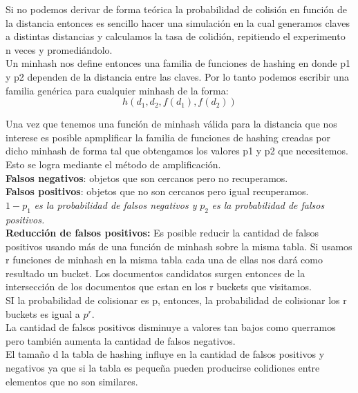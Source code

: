 \documentclass[titlepage,a4paper]{article}
\begin{document}
Si no podemos derivar de forma teórica la probabilidad de colisión en función de la distancia entonces es sencillo hacer una simulación en la cual generamos claves a distintas distancias y calculamos la tasa de colidión, repitiendo el experimento n veces y promediándolo. \\

Un minhash nos define entonces una familia de funciones de hashing en donde p1 y p2 dependen de la distancia entre las claves. Por lo tanto podemos escribir una familia genérica para cualquier minhash de la forma: 
$$ h(d_1,d_2,f(d_1),f(d_2))$$

Una vez que tenemos una función de minhash válida para la distancia que nos interese es posible apmplificar la familia de funciones de hashing creadas por dicho minhash de forma tal que obtengamos los valores p1 y p2 que necesitemos. Esto se logra mediante el método de amplificación. \\

\textbf{Falsos negativos}: objetos que son cercanos pero no recuperamos. \\

\textbf{Falsos positivos}: objetos que no son cercanos pero igual recuperamos. \\

$1-p_1 $\textit{ es la probabilidad de falsos negativos y} $p_2$ \textit{es la probabilidad de falsos positivos. }\\

\textbf{Reducción de falsos positivos:} Es posible reducir la cantidad de falsos positivos usando más de una función de minhash sobre la misma tabla. Si usamos r funciones de minhash en la misma tabla cada una de ellas nos dará como resultado un bucket. Los documentos candidatos surgen entonces de la intersección de los documentos que estan en los r buckets que visitamos. \\

SI la probabilidad de colisionar es p, entonces, la probabilidad de colisionar los r buckets es igual a $p^r$. \\

La cantidad de falsos positivos disminuye a valores tan bajos como querramos pero también aumenta la cantidad de falsos negativos. \\

El tamaño d la tabla de hashing influye en la cantidad de falsos positivos y negativos ya que si la tabla es pequeña pueden producirse colidiones entre elementos que no son similares. \\
\end{document}
